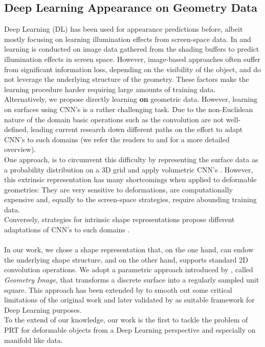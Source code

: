 \subsection*{Deep Learning Appearance on Geometry Data} 
Deep Learning (DL) has been used for appearance predictions before, albeit mostly focusing on learning illumination effects from screen-space data. In  \cite{Nalbach2017b} and \cite{DBLP} learning is conducted on image data gathered from the shading buffers to predict illumination effects in screen space. However, image-based approaches often suffer from significant information loss, depending on the visibility of the object, and do not leverage the underlying structure of the geometry. These factors make the learning procedure harder requiring large amounts of training data.
\\
Alternatively, we propose directly learning \textbf{on} geometric data.  However, learning on surfaces using CNN's is a rather challenging task. Due to the non-Euclidean nature of the domain basic operations such as the convolution are not well-defined, leading current research down different paths on the effort to adapt CNN's to such domains (we refer the readers to \cite{Geometric_deep_learning} and \cite{DeepGeoCourse} for a more detailed overview).
\\
One approach, is to circumvent this difficulty by representing the surface data as a probability distribution on a  3D grid and apply volumetric CNN's \cite{3d_ShapeNets}. However, this extrinsic representation has many shortcomings when applied to deformable geometries: They are very sensitive to deformations, are computationally expensive and, equally to the screen-space strategies, require abounding training data.
\\
Conversely, strategies for intrinsic shape representations propose different adaptations of CNN's to such domains \cite{ShapeNet1, BoscainiMRB16, CNN_on_Torus}.
\\
\\ 
In our work, we chose a shape representation that, on the one hand, can endow the underlying shape structure, and on the other hand, supports standard 2D convolution operations. We adopt a parametric approach introduced by \cite{gu2002geometry}, called \textit{Geometry Image}, that transforms a discrete surface into a regularly sampled unit square. This approach has been extended by \cite{Spherical_Parametrization} to smooth out some critical limitations of the original work and later validated by \cite{sinha2016deep} as suitable framework for Deep Learning purposes.
\\
To the extend of our knowledge, our work is the first to tackle the problem of PRT for deformable objects from a Deep Learning perspective and especially on manifold like data. 


